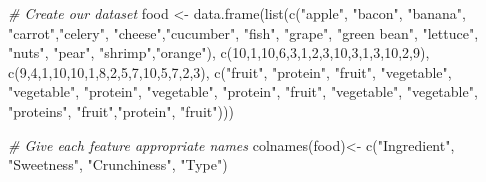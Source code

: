 \documentclass[
]{article}
\newenvironment{Shaded}{\begin{snugshade}}{\end{snugshade}}
\newcommand{\CommentTok}[1]{\textcolor[rgb]{0.56,0.35,0.01}{\textit{#1}}}
\newcommand{\DecValTok}[1]{\textcolor[rgb]{0.00,0.00,0.81}{#1}}
\newcommand{\FunctionTok}[1]{\textcolor[rgb]{0.00,0.00,0.00}{#1}}
\newcommand{\NormalTok}[1]{#1}
\newcommand{\OtherTok}[1]{\textcolor[rgb]{0.56,0.35,0.01}{#1}}
\newcommand{\StringTok}[1]{\textcolor[rgb]{0.31,0.60,0.02}{#1}}
\begin{document}
\begin{Shaded}
\begin{Highlighting}[]
\CommentTok{\# Create our dataset}
\NormalTok{food }\OtherTok{\textless{}{-}} \FunctionTok{data.frame}\NormalTok{(}\FunctionTok{list}\NormalTok{(}\FunctionTok{c}\NormalTok{(}\StringTok{"apple"}\NormalTok{, }\StringTok{"bacon"}\NormalTok{, }\StringTok{"banana"}\NormalTok{, }\StringTok{"carrot"}\NormalTok{,}\StringTok{"celery"}\NormalTok{, }\StringTok{"cheese"}\NormalTok{,}\StringTok{"cucumber"}\NormalTok{, }\StringTok{"fish"}\NormalTok{, }\StringTok{"grape"}\NormalTok{, }\StringTok{"green bean"}\NormalTok{, }\StringTok{"lettuce"}\NormalTok{, }\StringTok{"nuts"}\NormalTok{, }\StringTok{"pear"}\NormalTok{, }\StringTok{"shrimp"}\NormalTok{,}\StringTok{"orange"}\NormalTok{), }\FunctionTok{c}\NormalTok{(}\DecValTok{10}\NormalTok{,}\DecValTok{1}\NormalTok{,}\DecValTok{10}\NormalTok{,}\DecValTok{6}\NormalTok{,}\DecValTok{3}\NormalTok{,}\DecValTok{1}\NormalTok{,}\DecValTok{2}\NormalTok{,}\DecValTok{3}\NormalTok{,}\DecValTok{10}\NormalTok{,}\DecValTok{3}\NormalTok{,}\DecValTok{1}\NormalTok{,}\DecValTok{3}\NormalTok{,}\DecValTok{10}\NormalTok{,}\DecValTok{2}\NormalTok{,}\DecValTok{9}\NormalTok{), }\FunctionTok{c}\NormalTok{(}\DecValTok{9}\NormalTok{,}\DecValTok{4}\NormalTok{,}\DecValTok{1}\NormalTok{,}\DecValTok{10}\NormalTok{,}\DecValTok{10}\NormalTok{,}\DecValTok{1}\NormalTok{,}\DecValTok{8}\NormalTok{,}\DecValTok{2}\NormalTok{,}\DecValTok{5}\NormalTok{,}\DecValTok{7}\NormalTok{,}\DecValTok{10}\NormalTok{,}\DecValTok{5}\NormalTok{,}\DecValTok{7}\NormalTok{,}\DecValTok{2}\NormalTok{,}\DecValTok{3}\NormalTok{), }\FunctionTok{c}\NormalTok{(}\StringTok{"fruit"}\NormalTok{, }\StringTok{"protein"}\NormalTok{, }\StringTok{"fruit"}\NormalTok{, }\StringTok{"vegetable"}\NormalTok{, }\StringTok{"vegetable"}\NormalTok{, }\StringTok{"protein"}\NormalTok{, }\StringTok{"vegetable"}\NormalTok{, }\StringTok{"protein"}\NormalTok{, }\StringTok{"fruit"}\NormalTok{, }\StringTok{"vegetable"}\NormalTok{, }\StringTok{"vegetable"}\NormalTok{, }\StringTok{"proteins"}\NormalTok{, }\StringTok{"fruit"}\NormalTok{,}\StringTok{"protein"}\NormalTok{, }\StringTok{"fruit"}\NormalTok{)))}

\CommentTok{\# Give each feature appropriate names}
\FunctionTok{colnames}\NormalTok{(food)}\OtherTok{\textless{}{-}} \FunctionTok{c}\NormalTok{(}\StringTok{"Ingredient"}\NormalTok{, }\StringTok{"Sweetness"}\NormalTok{, }\StringTok{"Crunchiness"}\NormalTok{, }\StringTok{"Type"}\NormalTok{)}
\end{Highlighting}
\end{Shaded}
\end{document}
